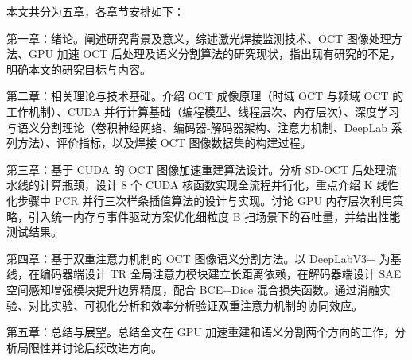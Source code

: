 本文共分为五章，各章节安排如下：

第一章：绪论。阐述研究背景及意义，综述激光焊接监测技术、OCT 图像处理方法、GPU 加速 OCT 后处理及语义分割算法的研究现状，指出现有研究的不足，明确本文的研究目标与内容。

第二章：相关理论与技术基础。介绍 OCT 成像原理（时域 OCT 与频域 OCT 的工作机制）、CUDA 并行计算基础（编程模型、线程层次、内存层次）、深度学习与语义分割理论（卷积神经网络、编码器-解码器架构、注意力机制、DeepLab 系列方法）、评价指标，以及焊接 OCT 图像数据集的构建过程。

第三章：基于 CUDA 的 OCT 图像加速重建算法设计。分析 SD-OCT 后处理流水线的计算瓶颈，设计 8 个 CUDA 核函数实现全流程并行化，重点介绍 K 线性化步骤中 PCR 并行三次样条插值算法的设计与实现。讨论 GPU 内存层次利用策略，引入统一内存与事件驱动方案优化细粒度 B 扫场景下的吞吐量，并给出性能测试结果。

第四章：基于双重注意力机制的 OCT 图像语义分割方法。以 DeepLabV3+ 为基线，在编码器端设计 TR 全局注意力模块建立长距离依赖，在解码器端设计 SAE 空间感知增强模块提升边界精度，配合 BCE+Dice 混合损失函数。通过消融实验、对比实验、可视化分析和效率分析验证双重注意力机制的协同效应。

第五章：总结与展望。总结全文在 GPU 加速重建和语义分割两个方向的工作，分析局限性并讨论后续改进方向。
